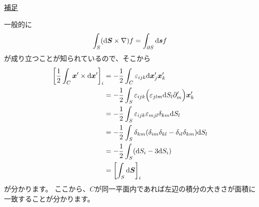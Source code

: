 \documentclass[a4paper, 12pt]{jsarticle}
\def\vec#1{\mbox{\boldmath $#1$}}
\newcommand{\ddif}{{\rm d}}
\begin{document}
\begin{screen}
	\underline{補足}

	一般的に
	\begin{align}
		\int_S ( \ddif \vec{S} \times \nabla) f
		= \int_{\partial S} \ddif \vec{s} f
	\end{align}
	が成り立つことが知られているので、そこから
	\begin{align}
		\left[ \frac{1}{2} \int_C \vec{x}' \times \ddif \vec{x}' \right]_i
		&= -\frac{1}{2} \int_C \varepsilon_{ijk} \ddif \vec{x}'_j \vec{x}'_k \\
		&= -\frac{1}{2} \int_S \varepsilon_{ijk}
		\Bigl( \varepsilon_{jlm} \ddif S_l \partial'_m \Bigr) \vec{x}'_k \\
		&= -\frac{1}{2} \int_S \varepsilon_{ijk} \varepsilon_{mjl} \delta_{km}
		\ddif S_l \\
		&= -\frac{1}{2} \int_S \delta_{km}
		(\delta_{im}\delta_{kl} - \delta_{il} \delta_{km}) \ddif S_l\\
		&= -\frac{1}{2} \int_S ( \ddif S_i - 3 \ddif S_i) \\
		&= \left[\int_S \ddif \vec{S}\right]_i
	\end{align}
	が分かります。
	ここから、$C$が同一平面内であれば左辺の積分の大きさが面積に一致することが分かります。
\end{screen}
\end{document}
